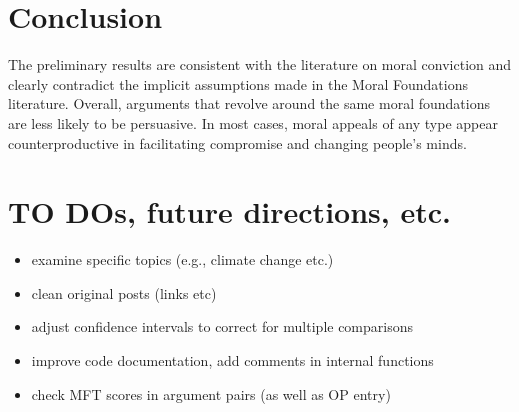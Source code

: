 \section{Conclusion}\label{conclusion}

The preliminary results are consistent with the literature on moral
conviction and clearly contradict the implicit assumptions made in the
Moral Foundations literature. Overall, arguments that revolve around the
same moral foundations are less likely to be persuasive. In most cases,
moral appeals of any type appear counterproductive in facilitating
compromise and changing people's minds.

\section{TO DOs, future directions,
etc.}\label{to-dos-future-directions-etc.}

\begin{itemize}
\item
  examine specific topics (e.g., climate change etc.)
\item
  clean original posts (links etc)
\item
  adjust confidence intervals to correct for multiple comparisons
\item
  improve code documentation, add comments in internal functions
\item
  check MFT scores in argument pairs (as well as OP entry)
\end{itemize}

